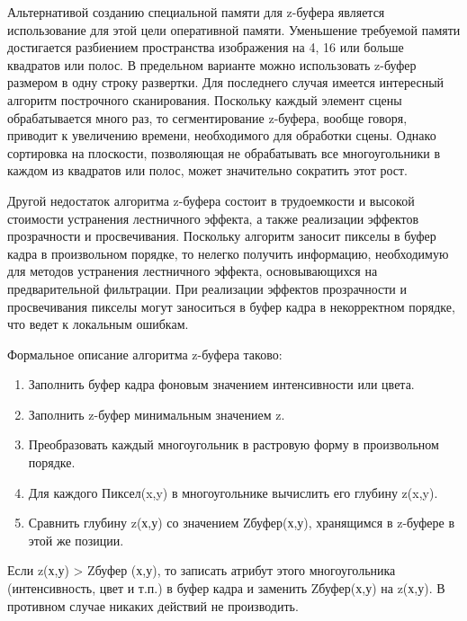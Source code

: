 Альтернативой созданию специальной памяти для z-буфера является использование для этой цели оперативной памяти. Уменьшение требуемой памяти достигается разбиением пространства изображения на 4, 16 или больше квадратов или полос. В предельном варианте можно использовать z-буфер размером в одну строку развертки. Для последнего случая имеется интересный алгоритм построчного сканирования. Поскольку каждый элемент сцены обрабатывается много раз, то сегментирование z-буфера, вообще говоря, приводит к увеличению времени, необходимого для обработки сцены. Однако сортировка на плоскости, позволяющая не обрабатывать все многоугольники в каждом из квадратов или полос, может значительно сократить этот рост.

Другой недостаток алгоритма z-буфера состоит в трудоемкости и высокой стоимости устранения лестничного эффекта, а также реализации эффектов прозрачности и просвечивания. Поскольку алгоритм заносит пикселы в буфер кадра в произвольном порядке, то нелегко получить информацию, необходимую для методов устранения лестничного эффекта, основывающихся на предварительной фильтрации. При реализации эффектов прозрачности и просвечивания пикселы могут заноситься в буфер кадра в некорректном порядке, что ведет к локальным ошибкам. 

Формальное описание алгоритма z-буфера таково:

\begin{enumerate}
\item Заполнить буфер кадра фоновым значением интенсивности или цвета.
\item Заполнить z-буфер минимальным значением z.
\item Преобразовать каждый многоугольник в растровую форму в произвольном порядке.
\item Для каждого Пиксел(x,y) в многоугольнике вычислить его глубину z(x,y).
\item Сравнить глубину z(х,у) со значением Zбуфер(х,у), хранящимся в z-буфере в этой же позиции.
\end{enumerate}

Если z(х,у) > Zбуфер (х,у), то записать атрибут этого многоугольника (интенсивность, цвет и т.п.) в буфер кадра и заменить Zбуфер(х,у) на z(х,у). В противном случае никаких действий не производить.~\cite{zbuffer}

